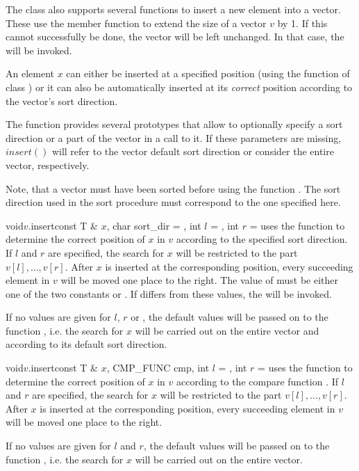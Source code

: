 

The class  also supports several functions to insert a new element into a
vector.  These use the member function  to extend the size of a vector $v$ by
1.  If this cannot successfully be done, the vector will be left unchanged.  In that case, the
\LEH will be invoked.

An element $x$ can either be inserted at a specified position (using the function
 of class ) or it can also be automatically inserted at
its \emph{correct} position according to the vector's sort direction.

The function  provides several prototypes that allow to optionally specify a sort
direction or a part of the vector in a call to it.  If these parameters are missing, $insert()$
will refer to the vector default sort direction or consider the entire vector, respectively.

Note, that a vector must have been sorted before using the function .  The sort
direction used in the sort procedure must correspond to the one specified here.

\begin{fcode}{void}{$v$.insert}{const T & $x$, char sort_dir = \DEF, int $l$ = \DEF, int $r$ = \DEF}
  uses the function  to determine the correct position of $x$ in $v$
  according to the specified sort direction.  If $l$ and $r$ are specified, the search for $x$
  will be restricted to the part $v[l], \dots, v[r]$.  After $x$ is inserted at the corresponding
  position, every succeeding element in $v$ will be moved one place to the right.  The value of
   must be either one of the two constants  or
  .  If  differs from these values, the \LEH will be
  invoked.
  
  If no values are given for $l$, $r$ or , the default values will be passed on
  to the function , i.e. the search for $x$ will be carried out on the entire
  vector and according to its default sort direction.
\end{fcode}

\begin{fcode}{void}{$v$.insert}{const T & $x$, CMP_FUNC cmp, int $l$ = \DEF, int $r$ = \DEF}
  uses the function  to determine the correct position of $x$ in $v$
  according to the compare function .  If $l$ and $r$ are specified, the search
  for $x$ will be restricted to the part $v[l], \dots, v[r]$.  After $x$ is inserted at the
  corresponding position, every succeeding element in $v$ will be moved one place to the right.
  
  If no values are given for $l$ and $r$, the default values will be passed on to the function
  , i.e. the search for $x$ will be carried out on the entire vector.
\end{fcode}

